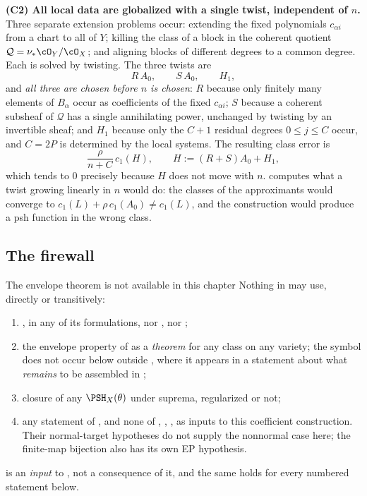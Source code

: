 \medskip\noindent\textbf{(C2) All local data are globalized with a single
twist, independent of $n$.}  Three separate extension problems occur:
extending the fixed polynomials $c_{\alpha i}$ from a chart to all of
$Y$; killing the class of a block in the coherent quotient
$\mathcal Q=\nu_*\cO_Y/\cO_X$; and aligning blocks of different degrees to
a common degree.  Each is solved by twisting.  The three twists are
\[
 R\,A_0,
 \qquad
 S\,A_0,
 \qquad
 H_1,
\]
and \emph{all three are chosen before $n$ is chosen}: $R$ because only
finitely many elements of $B_\alpha$ occur as coefficients of the fixed
$c_{\alpha i}$; $S$ because a coherent subsheaf of $\mathcal Q$ has a
single annihilating power, unchanged by twisting by an invertible sheaf; and
$H_1$ because only the $C+1$ residual degrees $0\le j\le C$ occur, and
$C=2P$ is determined by the local systems.  The resulting class error is
\[
 \frac{\rho}{n+C}\,c_1(H),
 \qquad
 H:=(R+S)A_0+H_1,
\]
which tends to $0$ precisely because $H$ does not move with $n$.
 computes what a twist growing linearly in
$n$ would do: the classes of the approximants would converge to
$c_1(L)+\rho\,c_1(A_0)\ne c_1(L)$, and the construction would produce a
psh function in the wrong class.

\subsection{The firewall}
\label{sec:ch44-firewall}

\begin{warning}{The envelope theorem is not available in this chapter}
\label{warn:ch44-firewall}
Nothing in  may use, directly or
transitively:
\begin{enumerate}
\item {}, in any of its formulations, nor
      , nor
      ;
\item the envelope property of  as a
      \emph{theorem} for any class on any variety; the symbol does not
      occur below outside , where it appears in a
      statement about what \emph{remains} to be assembled in
      ;
\item closure of any $\PSH_X(\theta)$ under suprema, regularized or not;
\item any statement of , and none of
      ,
      , ,
      as inputs to this coefficient construction.  Their normal-target
      hypotheses do not supply the nonnormal case here; the finite-map
      bijection also has its own EP hypothesis.
\end{enumerate}
 is an \emph{input} to
, not a consequence of it, and the same holds
for every numbered statement below.
\end{warning}

